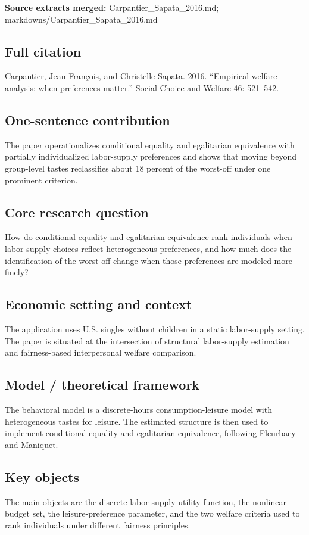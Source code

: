 \documentclass[11pt,a4paper]{article}
\begin{document}
\textbf{Source extracts merged:} Carpantier\_Sapata\_2016.md; markdowns/Carpantier\_Sapata\_2016.md

\subsection*{Full citation}
Carpantier, Jean-François, and Christelle Sapata. 2016. “Empirical welfare analysis: when preferences matter.” Social Choice and Welfare 46: 521–542.

\subsection*{One-sentence contribution}
The paper operationalizes conditional equality and egalitarian equivalence with partially individualized labor-supply preferences and shows that moving beyond group-level tastes reclassifies about 18 percent of the worst-off under one prominent criterion.

\subsection*{Core research question}
How do conditional equality and egalitarian equivalence rank individuals when labor-supply choices reflect heterogeneous preferences, and how much does the identification of the worst-off change when those preferences are modeled more finely?

\subsection*{Economic setting and context}
The application uses U.S. singles without children in a static labor-supply setting. The paper is situated at the intersection of structural labor-supply estimation and fairness-based interpersonal welfare comparison.

\subsection*{Model / theoretical framework}
The behavioral model is a discrete-hours consumption-leisure model with heterogeneous tastes for leisure. The estimated structure is then used to implement conditional equality and egalitarian equivalence, following Fleurbaey and Maniquet.

\subsection*{Key objects}
The main objects are the discrete labor-supply utility function, the nonlinear budget set, the leisure-preference parameter, and the two welfare criteria used to rank individuals under different fairness principles.
\end{document}
